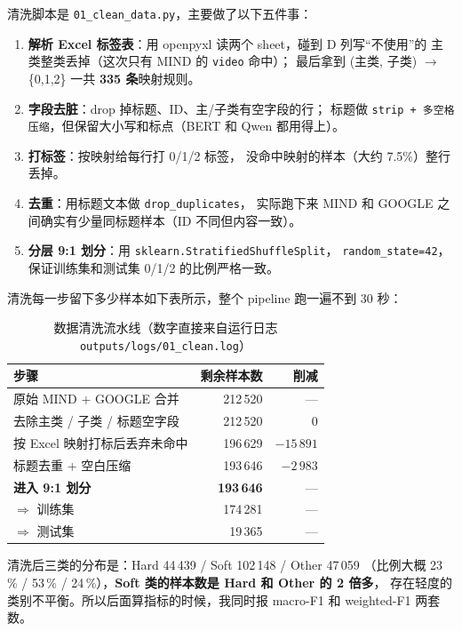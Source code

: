 \documentclass{SYSUReport}
\begin{document}
清洗脚本是 \verb|01_clean_data.py|，主要做了以下五件事：

\begin{enumerate}
    \item \textbf{解析 Excel 标签表}：用 openpyxl 读两个 sheet，碰到 D 列写“不使用”的
          主类整类丢掉（这次只有 MIND 的 \texttt{video} 命中）；
          最后拿到 (主类, 子类) $\to$ \{0,1,2\} 一共 \textbf{335 条}映射规则。
    \item \textbf{字段去脏}：drop 掉标题、ID、主/子类有空字段的行；
          标题做 \texttt{strip + 多空格压缩}，但保留大小写和标点（BERT 和 Qwen 都用得上）。
    \item \textbf{打标签}：按映射给每行打 0/1/2 标签，
          没命中映射的样本（大约 7.5\%）整行丢掉。
    \item \textbf{去重}：用标题文本做 \texttt{drop\_duplicates}，
          实际跑下来 MIND 和 GOOGLE 之间确实有少量同标题样本（ID 不同但内容一致）。
    \item \textbf{分层 9:1 划分}：用 \texttt{sklearn.StratifiedShuffleSplit}，
          \texttt{random\_state=42}，保证训练集和测试集 0/1/2 的比例严格一致。
\end{enumerate}

清洗每一步留下多少样本如下表所示，整个 pipeline 跑一遍不到 30 秒：

\begin{table}[!htbp]
\centering
\caption{数据清洗流水线（数字直接来自运行日志 \texttt{outputs/logs/01\_clean.log}）}
\label{tab:cleaning}
\begin{tabular}{lrr}
\toprule
步骤 & 剩余样本数 & 削减 \\
\midrule
原始 MIND + GOOGLE 合并          & 212\,520 & — \\
去除主类 / 子类 / 标题空字段      & 212\,520 & 0 \\
按 Excel 映射打标后丢弃未命中      & 196\,629 & $-15\,891$ \\
标题去重 + 空白压缩               & 193\,646 & $-2\,983$ \\
\midrule
\textbf{进入 9:1 划分}            & \textbf{193\,646} & — \\
$\Rightarrow$ 训练集              & 174\,281 & — \\
$\Rightarrow$ 测试集              &  19\,365 & — \\
\bottomrule
\end{tabular}
\end{table}

清洗后三类的分布是：Hard 44\,439 / Soft 102\,148 / Other 47\,059
（比例大概 23\,\% / 53\,\% / 24\,\%），\textbf{Soft 类的样本数是 Hard 和 Other 的 2 倍多}，
存在轻度的类别不平衡。所以后面算指标的时候，我同时报 macro-F1 和 weighted-F1 两套数。
\end{document}
